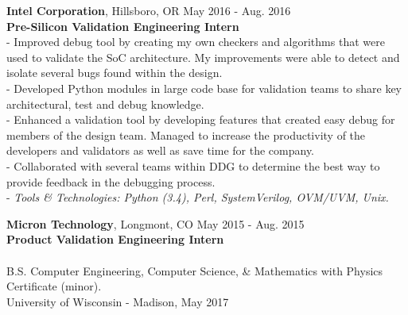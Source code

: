 \documentclass{resume}
\begin{document}
\begin{flushleft}
\textbf{Intel Corporation}, Hillsboro, OR \hfill May 2016 - Aug. 2016\\
\textbf{Pre-Silicon Validation Engineering Intern}\\
{\footnotesize
\ttab- Improved debug tool by creating my own checkers and algorithms that were used to validate the SoC architecture. My \ttab improvements were able to detect and isolate several bugs found within the design.\\
\ttab- Developed Python modules in large code base for validation teams to share key architectural, test and debug knowledge. \\
\ttab- Enhanced a validation tool by developing features that created easy debug for members of the design team. Managed to \ttab increase the productivity of the developers and validators as well as save time for the company. \\
\ttab- Collaborated with several teams within DDG to determine the best way to provide feedback in the debugging process. \\
\ttab- \textit{Tools \& Technologies: Python (3.4), Perl, SystemVerilog, OVM/UVM, Unix.}\\[3mm]
}

\textbf{Micron Technology}, Longmont, CO \hfill May 2015 - Aug. 2015\\
\textbf{Product Validation Engineering Intern}\\[5mm]

 \\
{\bigsize
	B.S. Computer Engineering, Computer Science, \& Mathematics with Physics Certificate (minor). \\
	University of Wisconsin - Madison, May 2017 } \\[5mm]


\end{flushleft}
\end{document}
